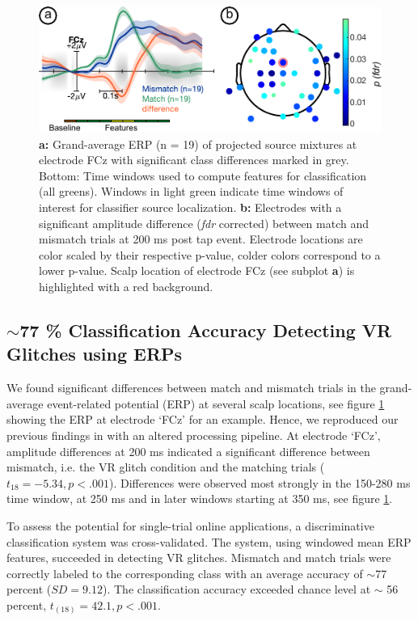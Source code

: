 
\begin{figure}[h]
  \includegraphics[width=.7\textwidth]{figures/erp_FCZ_diff_delay_with_scalp_map.pdf}
  \caption{\textcolor{n}{\textbf{a:}} Grand-average ERP (n = 19) of projected source mixtures at electrode FCz with significant class differences marked in grey. Bottom: Time windows used to compute features for classification (all greens). Windows in light green indicate time windows of interest for classifier source localization. \textcolor{n}{\textbf{b:} Electrodes with a significant amplitude difference (\textit{fdr} corrected) between match and mismatch trials at 200 ms post tap event. Electrode locations are color scaled by their respective p-value, colder colors correspond to a lower p-value. Scalp location of electrode FCz (see subplot \textbf{a}) is highlighted with a red background.}}
  \label{erp}
\end{figure}

\subsection{$\sim$77 \% Classification Accuracy Detecting VR Glitches using ERPs}

We found significant differences between match and mismatch trials in the grand-average event-related potential (ERP) at several scalp locations, see figure \ref{erp} showing the ERP at electrode `FCz' for an example. Hence, we reproduced our previous findings in \cite{Gehrke2019-og} with an altered processing pipeline. At electrode `FCz', amplitude differences at 200 ms indicated a significant difference between mismatch, i.e. the VR glitch condition and the matching trials ($t_{18} = -5.34, p < .001$). Differences were observed most strongly in the 150-280 ms time window, at 250 ms and in later windows starting at 350 ms, see figure \ref{erp}.

To assess the potential for single-trial online applications, a discriminative classification system was cross-validated. The system, using windowed mean ERP features, succeeded in detecting VR glitches. Mismatch and match trials were correctly labeled to the corresponding class with an average accuracy of $\sim$77 percent ($SD = 9.12$). The classification accuracy exceeded chance level at $\sim$ 56 percent, $t_{(18)} = 42.1, p < .001$. 

